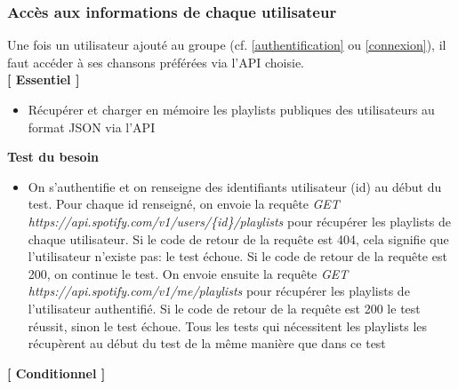 \documentclass{article}
\begin{document}
		\subsubsection{Accès aux informations de chaque utilisateur} 
		Une fois un utilisateur ajouté au groupe (cf. \ref{authentification} ou \ref{connexion}), il faut accéder à ses chansons préférées via l'API choisie. 
		\newline \\
		\textbf{[ Essentiel ]}
		\begin{itemize}
			\item Récupérer et charger en mémoire les playlists publiques des utilisateurs au format JSON via l'API
		\end{itemize}
		\textbf{Test du besoin}
		\begin{itemize}
			\item On s'authentifie et on renseigne des identifiants utilisateur (id) au début du test. Pour chaque id renseigné, on envoie la requête \newline\textit{GET https://api.spotify.com/v1/users/\{id\}/playlists} pour récupérer les playlists de chaque utilisateur. Si le code de retour de la requête est 404, cela signifie que l'utilisateur n'existe pas: le test échoue. Si le code de retour de la requête est 200, on continue le test. On envoie ensuite la requête \textit{ GET https://api.spotify.com/v1/me/playlists} pour récupérer les playlists de l'utilisateur authentifié. Si le code de retour de la requête est 200 le test réussit, sinon le test échoue. \newline
			      Tous les tests qui nécessitent les playlists les récupèrent au début du test de la même manière que dans ce test
		\end{itemize}
		\textbf{[ Conditionnel ]} \label{connexion de tous les utilisateurs}
\end{document}
